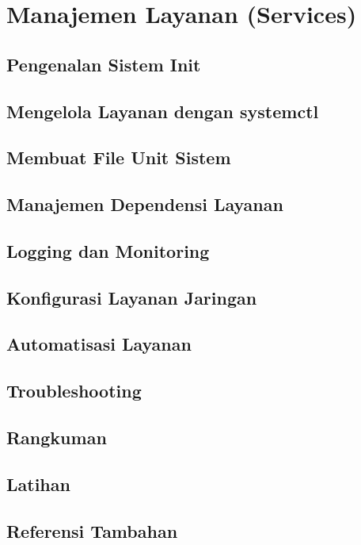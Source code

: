 
\chapter{Manajemen Layanan (Services)}
\label{ch:service-management}

\begin{abstract}
Bab ini membahas sistem init di Linux, systemd, mengelola layanan,
membuat unit file, dan troubleshooting layanan.
\end{abstract}

\section{Pengenalan Sistem Init}
\section{Mengelola Layanan dengan systemctl}
\section{Membuat File Unit Sistem}
\section{Manajemen Dependensi Layanan}
\section{Logging dan Monitoring}
\section{Konfigurasi Layanan Jaringan}
\section{Automatisasi Layanan}
\section{Troubleshooting}
\section{Rangkuman}
\section{Latihan}
\section{Referensi Tambahan}
